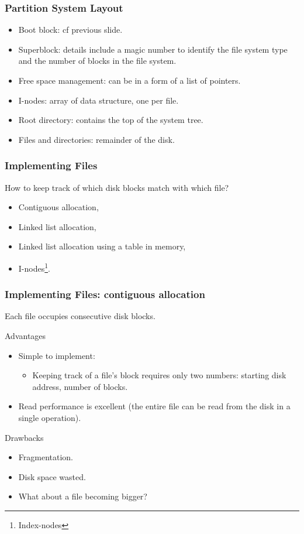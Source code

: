 \begin{frame}
  \frametitle{Partition System Layout}
    \begin{itemize}
      \item Boot block: cf previous slide.
      \item Superblock: details include a magic number to identify the file system type and the number of blocks in the file system.
      \item Free space management: can be in a form of a list of pointers.
      \item I-nodes: array of data structure, one per file.
      \item Root directory: contains the top of the system tree.
      \item Files and directories: remainder of the disk.
  \end{itemize}
\end{frame}

\begin{frame}
  \frametitle{Implementing Files}
  How to keep track of which disk blocks match with which file?
    \begin{itemize}
      \item Contiguous allocation,
      \item Linked list allocation,
      \item Linked list allocation using a table in memory,
      \item I-nodes\footnote{Index-nodes}.
  \end{itemize}
\end{frame}

\begin{frame}
    \frametitle{Implementing Files: contiguous allocation}
    Each file occupies consecutive disk blocks.
    \begin{block}{Advantages}
        \begin{itemize}
            \item Simple to implement:
                \begin{itemize}
                    \item Keeping track of a file's block requires only two numbers: starting disk address, number of blocks.
                \end{itemize}
            \item Read performance is excellent (the entire file can be read from the disk in a single operation).
        \end{itemize}
    \end{block}
    \begin{block}{Drawbacks}
        \begin{itemize}
            \item Fragmentation.
            \item Disk space wasted.
            \item What about a file becoming bigger?
        \end{itemize}
    \end{block}
\end{frame}

